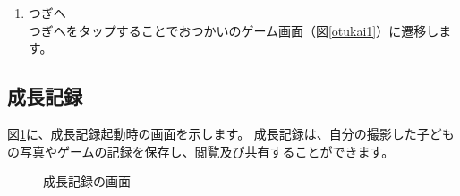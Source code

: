 \documentclass[a4j]{jarticle}
\begin{document}
\begin{enumerate}
  \renewcommand{\labelenumi}{\textcircled{\scriptsize \theenumi}}
\item つぎへ\\
  つぎへをタップすることでおつかいのゲーム画面（図\ref{otukai1}）に遷移します。
\end{enumerate}


\newpage
\subsection{成長記録}\label{grow}
図\ref{Grow}に、成長記録起動時の画面を示します。
成長記録は、自分の撮影した子どもの写真やゲームの記録を保存し、閲覧及び共有することができます。

\begin{figure}[H]
    \begin{center}
    \caption {成長記録の画面}
    \label{Grow}
    \end{center}
\end{figure}
\end{document}
